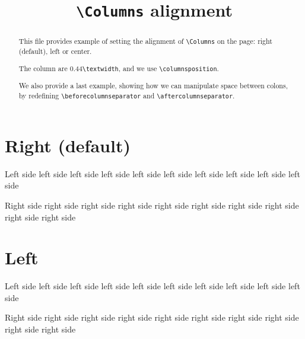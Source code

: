\documentclass{article}
\begin{document}
\title{\texttt{\textbackslash Columns} alignment}
\date{}
\maketitle
\begin{abstract}
This file provides example of setting the alignment of \texttt{\textbackslash{}Columns} on the page: right (default), left or center.

The column are 0.44\texttt{\textbackslash{}textwidth}, and we use \texttt{\textbackslash{}columnsposition}.

We also provide a last example, showing how we can manipulate space between colons, by redefining \texttt{\textbackslash{}beforecolumnseparator} and \texttt{\textbackslash{}aftercolumnseparator}.
\end{abstract}


\section{Right (default)}

\begin{pairs}

\begin{Leftside}
\beginnumbering
\pstart
Left side left side left side left side left side left side left side left side left side left side 
\pend
\endnumbering
\end{Leftside}

\begin{Rightside}
\beginnumbering
\pstart
Right side right side right side right side right side right side right side right side right side right side 
\pend
\endnumbering
\end{Rightside}
\end{pairs}
\Columns

\section{Left}

\begin{pairs}

\begin{Leftside}
\beginnumbering
\pstart
Left side left side left side left side left side left side left side left side left side left side 
\pend
\endnumbering
\end{Leftside}

\begin{Rightside}
\beginnumbering
\pstart
Right side right side right side right side right side right side right side right side right side right side 
\pend
\endnumbering
\end{Rightside}
\end{pairs}
\Columns
\end{document}
